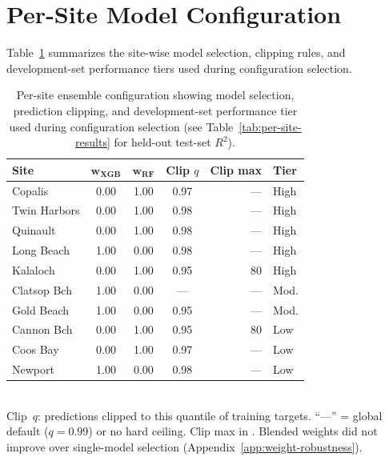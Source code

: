 \documentclass[toxins,article,submit,moreauthors]{Definitions/mdpi}
\begin{document}


\appendix
\appendixstart

\section{Per-Site Model Configuration}
\label{app:model-config}

Table~\ref{tab:ensemble-config} summarizes the site-wise model selection, clipping rules, and development-set performance tiers used during configuration selection.

\begin{table}[H]
\caption{Per-site ensemble configuration showing model selection, prediction clipping, and development-set performance tier used during configuration selection (see Table~\ref{tab:per-site-results} for held-out test-set $R^2$).}
\label{tab:ensemble-config}
\centering\footnotesize
\begin{tabular*}{\linewidth}{@{\extracolsep{\fill}}lcccrl}
\toprule
\textbf{Site} & $\boldsymbol{w_{\text{XGB}}}$ & $\boldsymbol{w_{\text{RF}}}$ & \textbf{Clip $q$} & \textbf{Clip max} & \textbf{Tier} \\
\midrule
Copalis       & 0.00 & 1.00 & 0.97 & --- & High \\
Twin Harbors  & 0.00 & 1.00 & 0.98 & --- & High \\
Quinault      & 0.00 & 1.00 & 0.98 & --- & High \\
Long Beach    & 1.00 & 0.00 & 0.98 & --- & High \\
Kalaloch      & 0.00 & 1.00 & 0.95 & 80  & High \\
\addlinespace
Clatsop Bch   & 1.00 & 0.00 & --- & --- & Mod. \\
Gold Beach    & 1.00 & 0.00 & 0.95 & --- & Mod. \\
\addlinespace
Cannon Bch    & 0.00 & 1.00 & 0.95 & 80  & Low \\
Coos Bay      & 0.00 & 1.00 & 0.97 & --- & Low \\
Newport       & 1.00 & 0.00 & 0.98 & --- & Low \\
\bottomrule
\end{tabular*}
\vspace{0.3em}\\
\footnotesize{Clip~$q$: predictions clipped to this quantile of training targets. ``---'' = global default ($q = 0.99$) or no hard ceiling. Clip max in \si{\microgrampeg}. Blended weights did not improve over single-model selection (Appendix~\ref{app:weight-robustness}).}
\end{table}
\end{document}
